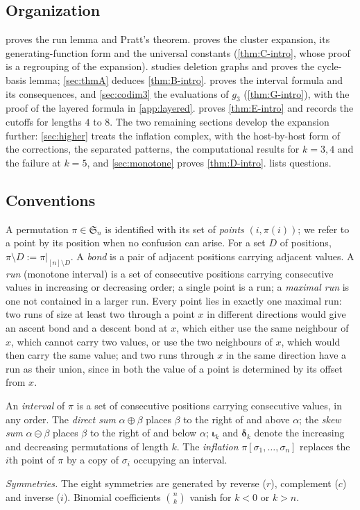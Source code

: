 \documentclass[11pt,reqno]{amsart}
\theoremstyle{plain}
\theoremstyle{definition}
\theoremstyle{remark}
\let\greekiota\iota
\renewcommand{\iota}{\boldsymbol{\greekiota}}
\newcommand{\dd}{\boldsymbol{\delta}}
\newcommand{\Sym}{\mathfrak{S}}
\begin{document}
\subsection{Organization}
 proves the run lemma and Pratt's theorem.  proves the cluster expansion, its generating-function form and the universal constants (\cref{thm:C-intro}, whose proof is a regrouping of the expansion).  studies deletion graphs and proves the cycle-basis lemma; \cref{sec:thmA} deduces \cref{thm:B-intro}.  proves the interval formula and its consequences, and \cref{sec:codim3} the evaluations of $g_3$ (\cref{thm:G-intro}), with the proof of the layered formula in \cref{app:layered}.  proves \cref{thm:E-intro} and records the cutoffs for lengths $4$ to $8$. The two remaining sections develop the expansion further: \cref{sec:higher} treats the inflation complex, with the host-by-host form of the corrections, the separated patterns, the computational results for $k=3,4$ and the failure at $k=5$, and \cref{sec:monotone} proves \cref{thm:D-intro}.  lists questions.

\subsection*{Conventions}
A permutation $\pi\in\Sym_n$ is identified with its set of \emph{points} $(i,\pi(i))$; we refer to a point by its position when no confusion can arise. For a set $D$ of positions, $\pi\setminus D:=\pi|_{[n]\setminus D}$. A \emph{bond} is a pair of adjacent positions carrying adjacent values. A \emph{run} (monotone interval) is a set of consecutive positions carrying consecutive values in increasing or decreasing order; a single point is a run; a \emph{maximal run} is one not contained in a larger run. Every point lies in exactly one maximal run: two runs of size at least two through a point $x$ in different directions would give an ascent bond and a descent bond at $x$, which either use the same neighbour of $x$, which cannot carry two values, or use the two neighbours of $x$, which would then carry the same value; and two runs through $x$ in the same direction have a run as their union, since in both the value of a point is determined by its offset from $x$. 

An \emph{interval} of $\pi$ is a set of consecutive positions carrying consecutive values, in any order. The \emph{direct sum} $\alpha\oplus\beta$ places $\beta$ to the right of and above $\alpha$; the \emph{skew sum} $\alpha\ominus\beta$ places $\beta$ to the right of and below $\alpha$; $\iota_k$ and $\dd_k$ denote the increasing and decreasing permutations of length $k$. The \emph{inflation} $\pi[\sigma_1,\dots,\sigma_n]$ replaces the $i$th point of $\pi$ by a copy of $\sigma_i$ occupying an interval. \par\smallskip\noindent\emph{Symmetries.} The eight symmetries are generated by reverse ($r$), complement ($c$) and inverse ($i$). Binomial coefficients $\binom nk$ vanish for $k<0$ or $k>n$.
\end{document}
